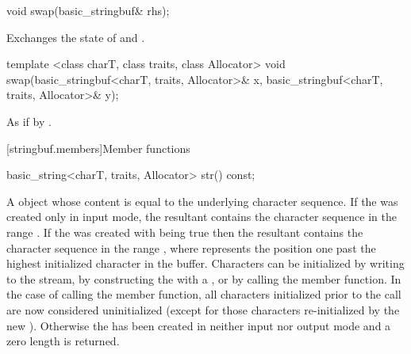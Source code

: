 %
\begin{itemdecl}
void swap(basic_stringbuf& rhs);
\end{itemdecl}

\begin{itemdescr}
\pnum
\effects Exchanges the state of 
and .
\end{itemdescr}

%
\begin{itemdecl}
template <class charT, class traits, class Allocator>
  void swap(basic_stringbuf<charT, traits, Allocator>& x,
            basic_stringbuf<charT, traits, Allocator>& y);
\end{itemdecl}

\begin{itemdescr}
\pnum
\effects As if by .
\end{itemdescr}

[stringbuf.members]{Member functions}

%
\begin{itemdecl}
basic_string<charT, traits, Allocator> str() const;
\end{itemdecl}

\begin{itemdescr}
\pnum
\returns
A
object whose content is equal to the
underlying character sequence.
If the  was created only in input mode, the resultant
 contains the character sequence in the range
. If the  was created with
 being true then the resultant 
contains the character sequence in the range , where
 represents the position one past the highest initialized character
in the buffer. Characters can be initialized by writing to the stream, by constructing
the  with a , or by calling the
 member function. In the case of calling the
 member function, all characters initialized prior to
the call are now considered uninitialized (except for those characters re-initialized
by the new ). Otherwise the  has been created
in neither input nor output mode and a zero length  is returned. 
\end{itemdescr}

